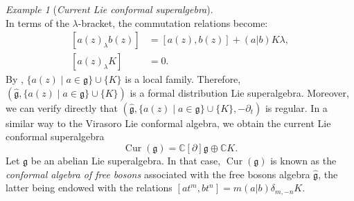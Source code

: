 \documentclass[a4paper, 12pt, reqno]{amsart}
\theoremstyle{remark}
\newtheorem{example}[theorem]{Example}
\numberwithin{equation}{subsection}
\DeclareMathOperator{\Cur}{Cur}
\begin{document}
\begin{example}[\emph{Current Lie conformal superalgebra}]
\begin{equation*}
  \end{equation*}
  In terms of the $\lambda$-bracket, the commutation relations become:
  \begin{equation*}
    \begin{split}
    [a(z)_{\lambda}b(z)] &= [a(z), b(z)] + (a| b)K\lambda, \\
    [a(z)_{\lambda}K] &= 0.
    \end{split}
  \end{equation*}
  By , $\{a(z) \mid a \in \mathfrak{g}\} \cup \{K\}$ is a local family.
  Therefore, $(\hat{\mathfrak{g}}, \{a(z) \mid a \in \mathfrak{g}\} \cup \{K\})$ is a formal distribution Lie superalgebra.
  Moreover, we can verify directly that $(\hat{\mathfrak{g}}, \{a(z) \mid a \in \mathfrak{g}\} \cup \{K\}, -\partial_t)$ is regular.
  In a similar way to the Virasoro Lie conformal algebra, we obtain the current Lie conformal superalgebra
  \begin{equation*}
    \Cur(\mathfrak{g}) = \mathbb{C}[\partial]\mathfrak{g} \oplus \mathbb{C}K.
  \end{equation*}
  Let $\mathfrak{g}$ be an abelian Lie superalgebra.
  In that case, $\Cur(\mathfrak{g})$ is known as the \emph{conformal algebra of free bosons} associated with the free bosons algebra $\hat{\mathfrak{g}}$, the latter being endowed with the relations $[at^m, bt^n] = m(a| b)\delta_{m, -n}K$.
\end{example}
\end{document}
